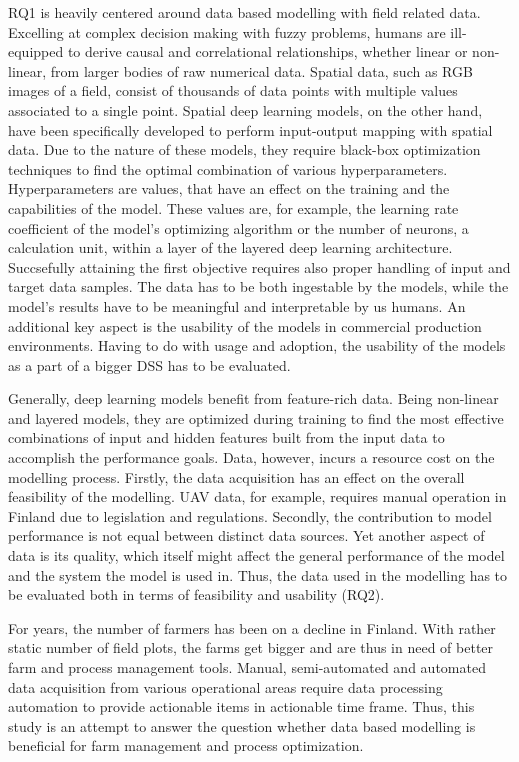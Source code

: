 RQ1 is heavily centered around data based modelling with field related data. Excelling at complex decision making with fuzzy problems, humans are ill-equipped to derive causal and correlational relationships, whether linear or non-linear, from larger bodies of raw numerical data. Spatial data, such as RGB images of a field, consist of thousands of data points with multiple values associated to a single point. Spatial deep learning models, on the other hand, have been specifically developed to perform input-output mapping with spatial data. Due to the nature of these models, they require black-box optimization techniques to find the optimal combination of various hyperparameters. Hyperparameters are values, that have an effect on the training and the capabilities of the model. These values are, for example, the learning rate coefficient of the model's optimizing algorithm or the number of neurons, a calculation unit, within a layer of the layered deep learning architecture. Succsefully attaining the first objective requires also proper handling of input and target data samples. The data has to be both ingestable by the models, while the model's results have to be meaningful and interpretable by us humans. An additional key aspect is the usability of the models in commercial production environments. Having to do with usage and adoption, the usability of the models as a part of a bigger DSS has to be evaluated.

Generally, deep learning models benefit from feature-rich data. Being non-linear and layered models, they are optimized during training to find the most effective combinations of input and hidden features built from the input data to accomplish the performance goals. Data, however, incurs a resource cost on the modelling process. Firstly, the data acquisition has an effect on the overall feasibility of the modelling. UAV data, for example, requires manual operation in Finland due to legislation and regulations. Secondly, the contribution to model performance is not equal between distinct data sources. Yet another aspect of data is its quality, which itself might affect the general performance of the model and the system the model is used in. Thus, the data used in the modelling has to be evaluated both in terms of feasibility and usability (RQ2).

For years, the number of farmers has been on a decline in Finland. With rather static number of field plots, the farms get bigger and are thus in need of better farm and process management tools. Manual, semi-automated and automated data acquisition from various operational areas require data processing automation to provide actionable items in actionable time frame. Thus, this study is an attempt to answer the question whether data based modelling is beneficial for farm management and process optimization.

